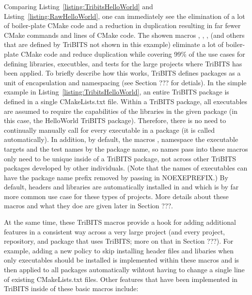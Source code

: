 \documentclass[10pt]{article}
\begin{document}
Comparing Listing~\ref{listing:TribitsHelloWorld} and Listing~\ref{listing:RawHelloWorld}, one can immediately see the elimination of a lot of boiler-plate CMake code and a reduction in duplication resulting in far fewer CMake commands and lines of CMake code.  The showen macros , , ,  (and others that are defined by TriBITS not shown in this example) eliminate a lot of boiler-plate CMake code and reduce duplication while covering 99\% of the use cases for defining libraries, executbles, and tests for the large projects where TriBITS has been applied.  To briefly describe how this works, TriBITS defines packages as a unit of encapsulation and namespacing (see Section ??? for detials).  In the simple example in Listing~\ref{listing:TribitsHelloWorld}, an entire TriBITS package is defined in a single CMakeLists.txt file.  Within a TriBITS package, all executables are assumed to require the capabilities of the libraries in the given package (in this case, the HelloWorld TriBITS package).  Therefore, there is no need to continually manually call  for every executable in a package (it is called automatically).  In addition, by default, the macros ,  namespace the executable targets and the test names by the package name, so names pass into these macros only need to be unique inside of a TriBITS package, not across other TriBITS packages developed by other individuals.  (Note that the names of executables can have the package name prefix removed by passing in NOEXEPREFIX.)  By default, headers and libraries are automatically installed in  and  which is by far more common use case for these types of projects.  More details about these macros and what they doe are given later in Section ???.

At the same time, these TriBITS macros provide a hook for adding additional features in a consistent way across a very large project (and every project, repository, and package that uses TriBITS; more on that in Section ???).  For example, adding a new policy to skip installing header files and libaries when only executables should be installed is implemented within these macros and is then applied to all packages automatically wihtout having to change a single line of existing CMakeLists.txt files.  Other features that have been implemented in TriBITS inside of these basic macros include:
\end{document}
